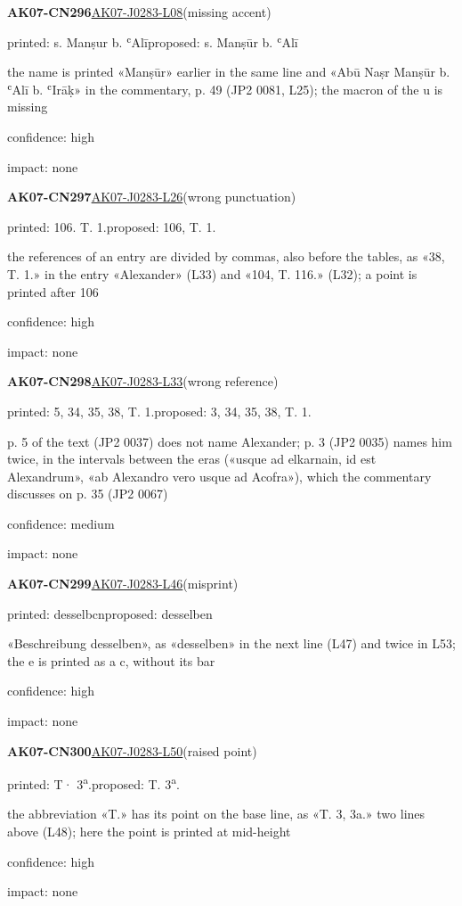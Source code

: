 \documentclass[11pt]{article}
\begin{document}
\noindent\textbf{AK07-CN296}\enspace\hyperlink{AK07-J0283-L08}{AK07-J0283-L08}\enspace(missing accent)\par\noindent printed: s. Manṣur b. ʿAlī\enspace proposed: s. Manṣūr b. ʿAlī\par\noindent the name is printed «Manṣūr» earlier in the same line and «Abū Naṣr Manṣūr b. ʿAlī b. ʿIrāḳ» in the commentary, p. 49 (JP2 0081, L25); the macron of the u is missing\par\noindent confidence: high\par\noindent impact: none\par\medskip
\noindent\textbf{AK07-CN297}\enspace\hyperlink{AK07-J0283-L26}{AK07-J0283-L26}\enspace(wrong punctuation)\par\noindent printed: 106. T. 1.\enspace proposed: 106, T. 1.\par\noindent the references of an entry are divided by commas, also before the tables, as «38, T. 1.» in the entry «Alexander» (L33) and «104, T. 116.» (L32); a point is printed after 106\par\noindent confidence: high\par\noindent impact: none\par\medskip
\noindent\textbf{AK07-CN298}\enspace\hyperlink{AK07-J0283-L33}{AK07-J0283-L33}\enspace(wrong reference)\par\noindent printed: 5, 34, 35, 38, T. 1.\enspace proposed: 3, 34, 35, 38, T. 1.\par\noindent p. 5 of the text (JP2 0037) does not name Alexander; p. 3 (JP2 0035) names him twice, in the intervals between the eras («usque ad elkarnain, id est Alexandrum», «ab Alexandro vero usque ad Acofra»), which the commentary discusses on p. 35 (JP2 0067)\par\noindent confidence: medium\par\noindent impact: none\par\medskip
\noindent\textbf{AK07-CN299}\enspace\hyperlink{AK07-J0283-L46}{AK07-J0283-L46}\enspace(misprint)\par\noindent printed: desselbcn\enspace proposed: desselben\par\noindent «Beschreibung desselben», as «desselben» in the next line (L47) and twice in L53; the e is printed as a c, without its bar\par\noindent confidence: high\par\noindent impact: none\par\medskip
\noindent\textbf{AK07-CN300}\enspace\hyperlink{AK07-J0283-L50}{AK07-J0283-L50}\enspace(raised point)\par\noindent printed: T· 3\textsuperscript{a}.\enspace proposed: T. 3\textsuperscript{a}.\par\noindent the abbreviation «T.» has its point on the base line, as «T. 3, 3a.» two lines above (L48); here the point is printed at mid-height\par\noindent confidence: high\par\noindent impact: none\par\medskip
\end{document}
